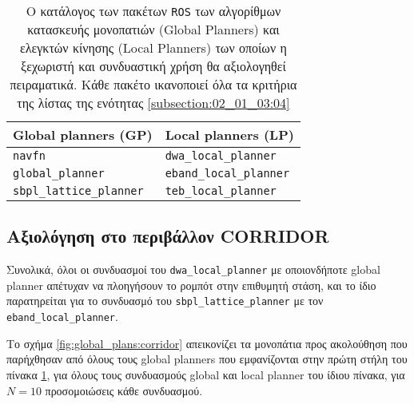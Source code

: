 \begin{table}[h]\centering
\begin{tabular}{l|l}
  Global planners (GP) & Local planners (LP) \\ \toprule
  \texttt{navfn} & \texttt{dwa\_local\_planner} \\
  \texttt{global\_planner} & \texttt{eband\_local\_planner} \\
  \texttt{sbpl\_lattice\_planner} & \texttt{teb\_local\_planner} \\ \bottomrule
\end{tabular}
  \caption{\small Ο κατάλογος των πακέτων \texttt{ROS} των αλγορίθμων κατασκευής
           μονοπατιών (Global Planners) και ελεγκτών κίνησης (Local Planners)
           των οποίων η ξεχωριστή και συνδυαστική χρήση θα αξιολογηθεί
           πειραματικά. Κάθε πακέτο ικανοποιεί όλα τα κριτήρια της λίστας
           της ενότητας \ref{subsection:02_01_03:04}}
\label{tbl:planners_sifted_list}
\end{table}


\subsection{Αξιολόγηση στο περιβάλλον CORRIDOR}
\label{subsection:02_01_04:02}

Συνολικά, όλοι οι συνδυασμοί του \texttt{dwa\_local\_planner} με οποιονδήποτε
global planner απέτυχαν να πλοηγήσουν το ρομπότ στην επιθυμητή στάση, και το
ίδιο παρατηρείται για το συνδυασμό του \texttt{sbpl\_lattice\_planner} με τον
\texttt{eband\_local\_planner}.

Το σχήμα \ref{fig:global_plans:corridor} απεικονίζει τα μονοπάτια προς
ακολούθηση που παρήχθησαν από όλους τους global planners που εμφανίζονται στην
πρώτη στήλη του πίνακα \ref{tbl:planners_sifted_list}, για όλους τους
συνδυασμούς global και local planner του ίδιου πίνακα, για $N=10$ προσομοιώσεις
κάθε συνδυασμού.

